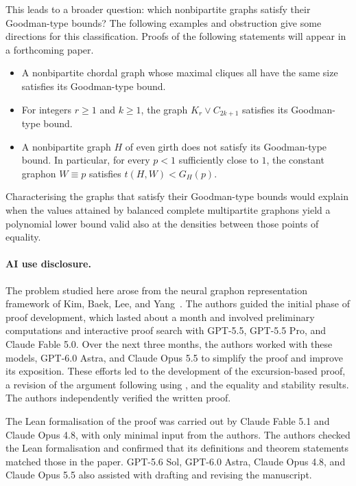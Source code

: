 \documentclass[11pt]{article}
\theoremstyle{remark}
\numberwithin{equation}{section}
\newcommand{\dens}[2]{t(#1,#2)}
\begin{document}
This leads to a broader question: which nonbipartite graphs satisfy their
Goodman-type bounds? The following examples and obstruction give some
directions for this classification.
Proofs of the following statements will appear in a forthcoming paper.
\begin{itemize}
  \item A nonbipartite chordal graph whose maximal cliques all have the
  same size satisfies its Goodman-type bound. 
  \item For integers $r\ge1$ and $k\ge1$, the graph $K_r\vee C_{2k+1}$
  satisfies its Goodman-type bound.
  \item A nonbipartite graph $H$ of even girth does not satisfy its
  Goodman-type bound. In particular, for every $p<1$ sufficiently close to $1$, the
  constant graphon $W\equiv p$ satisfies $\dens HW<G_H(p)$.
\end{itemize}
Characterising the graphs that satisfy their Goodman-type bounds would
explain when the values attained by balanced complete multipartite graphons
yield a polynomial lower bound valid also at the densities between those
points of equality.

\paragraph{AI use disclosure.}
The problem studied here arose from the neural graphon representation
framework of Kim, Baek, Lee, and Yang~\cite{kim2026implicit}.
The authors guided the initial phase of proof development, which lasted
about a month and involved preliminary computations and interactive proof
search with GPT-5.5, GPT-5.5 Pro, and Claude Fable 5.0.
Over the next three months, the authors worked with these models,
GPT-6.0 Astra, and Claude Opus 5.5 to simplify the proof and improve its exposition.
These efforts led to the development of the excursion-based proof,
a revision of the argument following  using
, and the equality and stability results.
The authors independently verified the written proof.

The Lean formalisation of the proof was carried out by Claude Fable 5.1
and Claude Opus 4.8, with only minimal input from the authors.
The authors checked the Lean formalisation and confirmed that its definitions
and theorem statements matched those in the paper.
GPT-5.6 Sol, GPT-6.0 Astra, Claude Opus 4.8, and Claude Opus 5.5 also assisted with drafting and revising
the manuscript.
\end{document}
